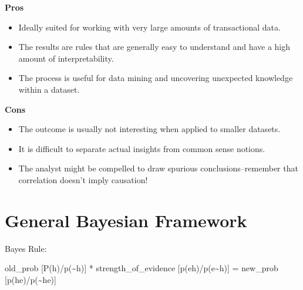 \documentclass[]{book}
\theoremstyle{definition}
\theoremstyle{definition}
\theoremstyle{definition}
\theoremstyle{remark}
\begin{document}
\textbf{Pros}

\begin{itemize}
\item
  Ideally suited for working with very large amounts of transactional
  data.
\item
  The results are rules that are generally easy to understand and have a
  high amount of interpretability.
\item
  The process is useful for data mining and uncovering unexpected
  knowledge within a dataset.
\end{itemize}

\textbf{Cons}

\begin{itemize}
\item
  The outcome is usually not interesting when applied to smaller
  datasets.
\item
  It is difficult to separate actual insights from common sense notions.
\item
  The analyst might be compelled to draw spurious conclusions--remember
  that correlation doesn't imply causation!
\end{itemize}

\section{General Bayesian Framework}\label{general-bayesian-framework}

Bayes Rule:

old\_prob {[}P(h)/p(\textasciitilde{}h){]} * strength\_of\_evidence
{[}p(e\textbar{}h)/p(e\textbar{}\textasciitilde{}h){]} = new\_prob
{[}p(h\textbar{}e)/p(\textasciitilde{}h\textbar{}e){]}
\end{document}
